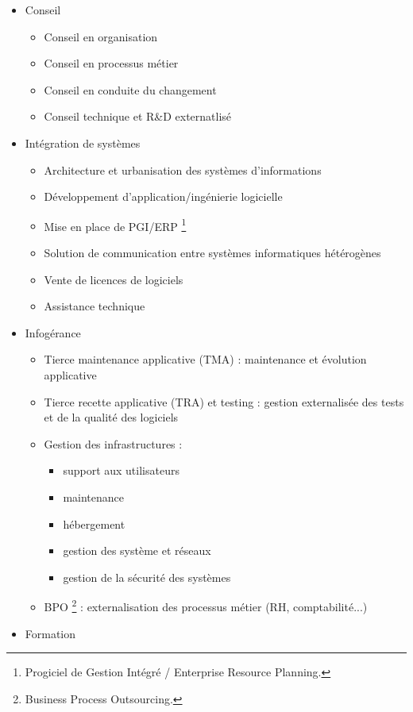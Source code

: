 \documentclass{article}
\begin{document}
\begin{itemize}
  \item[\ding{51}] Conseil
    \begin{itemize}
      \item Conseil en organisation
      \item Conseil en processus métier
      \item Conseil en conduite du changement
      \item Conseil technique et R{\&}D externatlisé
    \end{itemize}
  \item[\ding{51}] Intégration de systèmes
    \begin{itemize}
      \item Architecture et urbanisation des systèmes d'informations
      \item Développement d'application/ingénierie logicielle
      \item Mise en place de PGI/ERP \footnote{Progiciel de Gestion Intégré / Enterprise Resource Planning.}
      \item Solution de communication entre systèmes informatiques hétérogènes
      \item Vente de licences de logiciels
      \item Assistance technique
    \end{itemize}
  \item[\ding{51}] Infogérance
    \begin{itemize}
      \item Tierce maintenance applicative (TMA) : maintenance et évolution applicative
      \item Tierce recette applicative (TRA) et testing : gestion externalisée des tests et de la qualité des logiciels
      \item Gestion des infrastructures :
        \begin{itemize}
          \item[\ding{219}] support aux utilisateurs
          \item[\ding{219}] maintenance
          \item[\ding{219}] hébergement
          \item[\ding{219}] gestion des système et réseaux
          \item[\ding{219}] gestion de la sécurité des systèmes
        \end{itemize}
      \item BPO \footnote{Business Process Outsourcing.} : externalisation des processus métier (RH, comptabilité...)
    \end{itemize}
  \item[\ding{51}] Formation
\end{itemize}
\end{document}

